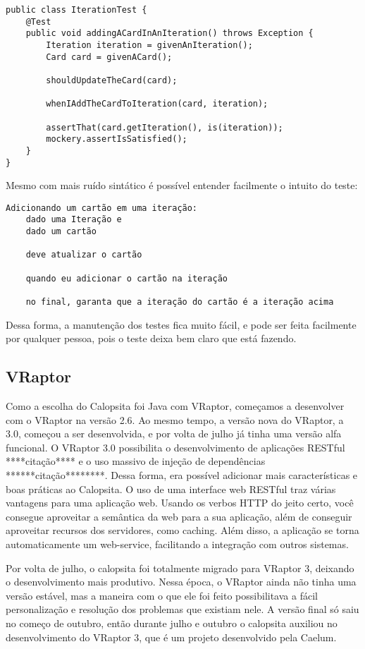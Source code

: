 \begin{lstlisting}
public class IterationTest {
	@Test
	public void addingACardInAnIteration() throws Exception {
		Iteration iteration = givenAnIteration();
		Card card = givenACard();

		shouldUpdateTheCard(card);

		whenIAddTheCardToIteration(card, iteration);

		assertThat(card.getIteration(), is(iteration));
		mockery.assertIsSatisfied();
	}
}
\end{lstlisting}

Mesmo com mais ruído sintático é possível entender facilmente o intuito do teste:

\begin{verbatim}
Adicionando um cartão em uma iteração:
	dado uma Iteração e
	dado um cartão
  
	deve atualizar o cartão
  
	quando eu adicionar o cartão na iteração
  
	no final, garanta que a iteração do cartão é a iteração acima
\end{verbatim}

Dessa forma, a manutenção dos testes fica muito fácil, e pode ser feita facilmente por qualquer pessoa, pois o teste deixa bem claro que está fazendo.


\subsection{VRaptor}

Como a escolha do Calopsita foi Java com VRaptor, começamos a desenvolver com o VRaptor na versão 2.6. 
Ao mesmo tempo, a versão nova do VRaptor, a 3.0, começou a ser desenvolvida, e por volta de julho já tinha 
uma versão alfa funcional. O VRaptor 3.0 possibilita o desenvolvimento de aplicações RESTful ****citação**** 
e o uso massivo de injeção de dependências ******citação********. Dessa forma, era possível adicionar mais 
características e boas práticas ao Calopsita. O uso de uma interface web RESTful traz várias vantagens para 
uma aplicação web. Usando os verbos HTTP do jeito certo, você consegue aproveitar a semântica da web para a 
sua aplicação, além de conseguir aproveitar recursos dos servidores, como caching. Além disso, a aplicação 
se torna automaticamente um web-service, facilitando a integração com outros sistemas.

Por volta de julho, o calopsita foi totalmente migrado para VRaptor 3, deixando o desenvolvimento mais produtivo. 
Nessa época, o VRaptor ainda não tinha uma versão estável, mas a maneira com o que ele foi feito possibilitava a fácil
personalização e resolução dos problemas que existiam nele. A versão final só saiu no começo de outubro, então durante 
julho e outubro o calopsita auxiliou no desenvolvimento do VRaptor 3, que é um projeto \opensource desenvolvido pela Caelum.

